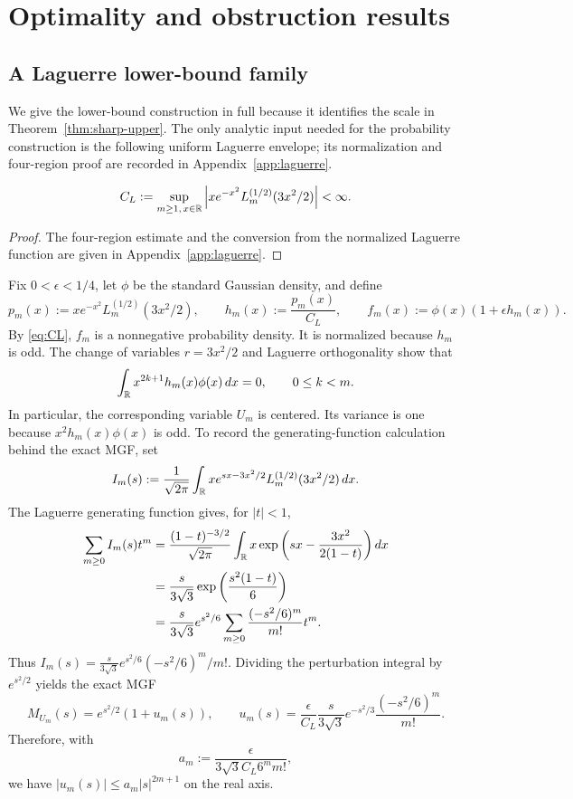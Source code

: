 \section{Optimality and obstruction results}\label{sec:sharpness}

\subsection{A Laguerre lower-bound family}

We give the lower-bound construction in full because it identifies the scale in Theorem~\ref{thm:sharp-upper}. The only analytic input needed for the probability construction is the following uniform Laguerre envelope; its normalization and four-region proof are recorded in Appendix~\ref{app:laguerre}.
\begin{lemma}\label{lem:laguerre-envelope}
\begin{equation}\label{eq:CL}
C_L:=\sup_{m\ge1,\,x\in\mathbb R}\left|x e^{-x^2}L_m^{(1/2)}(3x^2/2)\right|<\infty.
\end{equation}
\end{lemma}
\begin{proof}
The four-region estimate and the conversion from the normalized Laguerre function are given in Appendix~\ref{app:laguerre}.
\end{proof}

Fix $0<\epsilon<1/4$, let $\phi$ be the standard Gaussian density, and define
\[
p_m(x):=x e^{-x^2}L_m^{(1/2)}(3x^2/2),
\qquad h_m(x):=\frac{p_m(x)}{C_L},
\qquad f_m(x):=\phi(x)(1+\epsilon h_m(x)).
\]
By \eqref{eq:CL}, $f_m$ is a nonnegative probability density. It is normalized because $h_m$ is odd. The change of variables $r=3x^2/2$ and Laguerre orthogonality show that
\[
\int_\mathbb R x^{2k+1}h_m(x)\phi(x)\,dx=0,
\qquad 0\le k<m.
\]
In particular, the corresponding variable $U_m$ is centered. Its variance is one because $x^2h_m(x)\phi(x)$ is odd. To record the generating-function calculation behind the exact MGF, set
\[
I_m(s):=\frac1{\sqrt{2\pi}}\int_\mathbb R x e^{sx-3x^2/2}L_m^{(1/2)}(3x^2/2)\,dx.
\]
The Laguerre generating function gives, for $|t|<1$,
\begin{align*}
\sum_{m\ge0}I_m(s)t^m
&=\frac{(1-t)^{-3/2}}{\sqrt{2\pi}}\int_\mathbb R x
\exp\left(sx-\frac{3x^2}{2(1-t)}\right)dx\\
&=\frac{s}{3\sqrt3}\exp\left(\frac{s^2(1-t)}6\right)\\
&=\frac{s}{3\sqrt3}e^{s^2/6}
\sum_{m\ge0}\frac{(-s^2/6)^m}{m!}t^m.
\end{align*}
Thus $I_m(s)=\frac{s}{3\sqrt3}e^{s^2/6}(-s^2/6)^m/m!$. Dividing the perturbation integral by $e^{s^2/2}$ yields the exact MGF
\begin{equation}\label{eq:laguerre-mgf}
M_{U_m}(s)=e^{s^2/2}(1+u_m(s)),
\qquad
u_m(s)=\frac{\epsilon}{C_L}\frac{s}{3\sqrt3}e^{-s^2/3}\frac{(-s^2/6)^m}{m!}.
\end{equation}
Therefore, with
\[
a_m:=\frac{\epsilon}{3\sqrt3 C_L6^m m!},
\]
we have $|u_m(s)|\le a_m|s|^{2m+1}$ on the real axis.

